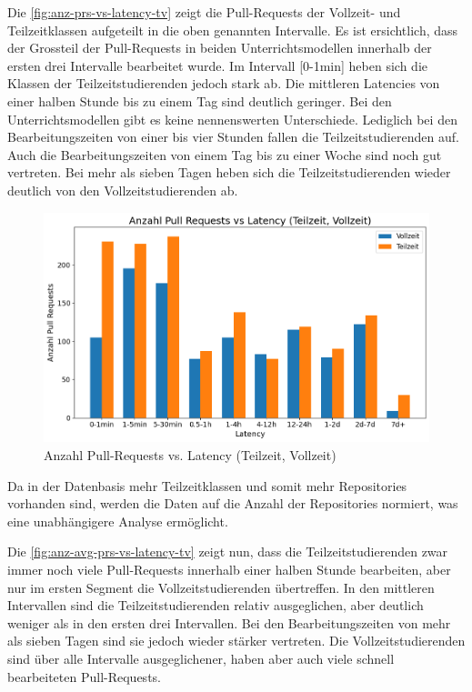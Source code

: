 Die \autoref{fig:anz-prs-vs-latency-tv} zeigt die Pull-Requests der Vollzeit- und Teilzeitklassen aufgeteilt in die oben genannten Intervalle. Es ist ersichtlich, dass der Grossteil der Pull-Requests in beiden Unterrichtsmodellen innerhalb der ersten drei Intervalle bearbeitet wurde. Im Intervall [0-1min] heben sich die Klassen der Teilzeitstudierenden jedoch stark ab. 
Die mittleren Latencies von einer halben Stunde bis zu einem Tag sind deutlich geringer. Bei den Unterrichtsmodellen gibt es keine nennenswerten Unterschiede. Lediglich bei den Bearbeitungszeiten von einer bis vier Stunden fallen die Teilzeitstudierenden auf. Auch die Bearbeitungszeiten von einem Tag bis zu einer Woche sind noch gut vertreten. Bei mehr als sieben Tagen heben sich die Teilzeitstudierenden wieder deutlich von den Vollzeitstudierenden ab.

\begin{figure}[htbp]
    \includegraphics[width=\textwidth]{Figures/anz-prs-vs-latency-tv.png}
    \caption{Anzahl Pull-Requests vs. Latency (Teilzeit, Vollzeit)}
    \label{fig:anz-prs-vs-latency-tv}
\end{figure}


Da in der Datenbasis mehr Teilzeitklassen und somit mehr Repositories vorhanden sind, werden die Daten auf die Anzahl der Repositories normiert, was eine unabhängigere Analyse ermöglicht.

\newpage
Die \autoref{fig:anz-avg-prs-vs-latency-tv} zeigt nun, dass die Teilzeitstudierenden zwar immer noch viele Pull-Requests innerhalb einer halben Stunde bearbeiten, aber nur im ersten Segment die Vollzeitstudierenden übertreffen. In den mittleren Intervallen sind die Teilzeitstudierenden relativ ausgeglichen, aber deutlich weniger als in den ersten drei Intervallen. Bei den Bearbeitungszeiten von mehr als sieben Tagen sind sie jedoch wieder stärker vertreten. Die Vollzeitstudierenden sind über alle Intervalle ausgeglichener, haben aber auch viele schnell bearbeiteten Pull-Requests.


